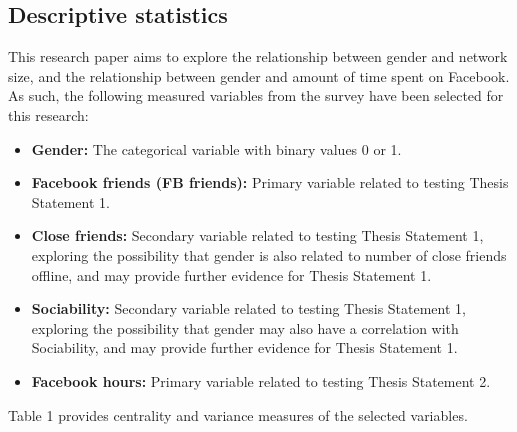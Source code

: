 
\subsection{Descriptive statistics}

This research paper aims to explore the relationship between gender and network size, and the relationship between gender and amount of time spent on Facebook. As such, the following measured variables from the survey have been selected for this research:\\

\newpage
\begin{itemize}
\item \textbf{Gender:} The categorical variable with binary values 0 or 1.
\item \textbf{Facebook friends (FB friends):} Primary variable related to testing Thesis Statement 1.
\item \textbf{Close friends:} Secondary variable related to testing Thesis Statement 1, exploring the possibility that gender is also related to number of close friends offline, and may provide further evidence for Thesis Statement 1.
\item \textbf{Sociability:} Secondary variable related to testing Thesis Statement 1, exploring the possibility that gender may also have a correlation with Sociability, and may provide further evidence for Thesis Statement 1.
\item \textbf{Facebook hours:} Primary variable related to testing Thesis Statement 2.
\end{itemize}

Table 1 provides centrality and variance measures of the selected variables.\\

